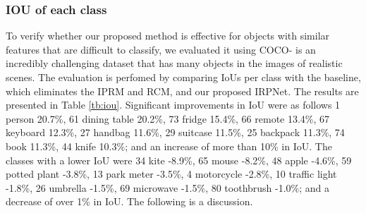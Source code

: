 \documentclass[runningheads]{llncs}
\begin{document}
\subsubsection{IOU of each class}
To verify whether our proposed method is effective for objects with similar features that are difficult to classify, we evaluated it using COCO- is an incredibly challenging dataset that has many objects in the images of realistic scenes. 
The evaluation is perfomed by comparing IoUs per class with the baseline, which eliminates the IPRM and RCM, and our proposed IRPNet.
The results are presented in Table \ref{tb:iou}.
Significant improvements in IoU were as follows 1 person 20.7\%, 61 dining table 20.2\%, 73 fridge 15.4\%, 66 remote 13.4\%, 67 keyboard 12.3\%, 27 handbag 11.6\%, 29 suitcase 11.5\%, 25 backpack 11.3\%, 74 book 11.3\%, 44 knife 10.3\%; and an increase of more than 10\% in IoU.
The classes with a lower IoU were 34 kite -8.9\%, 65 mouse -8.2\%, 48 apple -4.6\%, 59 potted plant -3.8\%, 13 park meter -3.5\%, 4 motorcycle -2.8\%, 10 traffic light -1.8\%, 26 umbrella -1.5\%, 69 microwave -1.5\%, 80 toothbrush -1.0\%; and a decrease of over 1\% in IoU.
The following is a discussion.
\end{document}
